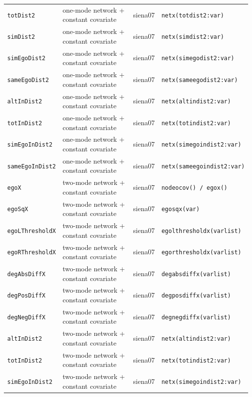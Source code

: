 \begin{longtable}{@{}p{2.6cm}p{3.2cm}p{2.9cm}p{5.4cm}@{}}
\texttt{totDist2} & one-mode network + constant covariate & siena07 & \texttt{netx(totdist2:var)}\\
\texttt{simDist2} & one-mode network + constant covariate & siena07 & \texttt{netx(simdist2:var)}\\
\texttt{simEgoDist2} & one-mode network + constant covariate & siena07 & \texttt{netx(simegodist2:var)}\\
\texttt{sameEgoDist2} & one-mode network + constant covariate & siena07 & \texttt{netx(sameegodist2:var)}\\
\texttt{altInDist2} & one-mode network + constant covariate & siena07 & \texttt{netx(altindist2:var)}\\
\texttt{totInDist2} & one-mode network + constant covariate & siena07 & \texttt{netx(totindist2:var)}\\
\texttt{simEgoInDist2} & one-mode network + constant covariate & siena07 & \texttt{netx(simegoindist2:var)}\\
\texttt{sameEgoInDist2} & one-mode network + constant covariate & siena07 & \texttt{netx(sameegoindist2:var)}\\
\texttt{egoX} & two-mode network + constant covariate & siena07 & \texttt{nodeocov() / egox()}\\
\texttt{egoSqX} & two-mode network + constant covariate & siena07 & \texttt{egosqx(var)}\\
\texttt{egoLThresholdX} & two-mode network + constant covariate & siena07 & \texttt{egolthresholdx(varlist)}\\
\texttt{egoRThresholdX} & two-mode network + constant covariate & siena07 & \texttt{egorthresholdx(varlist)}\\
\texttt{degAbsDiffX} & two-mode network + constant covariate & siena07 & \texttt{degabsdiffx(varlist)}\\
\texttt{degPosDiffX} & two-mode network + constant covariate & siena07 & \texttt{degposdiffx(varlist)}\\
\texttt{degNegDiffX} & two-mode network + constant covariate & siena07 & \texttt{degnegdiffx(varlist)}\\
\texttt{altInDist2} & two-mode network + constant covariate & siena07 & \texttt{netx(altindist2:var)}\\
\texttt{totInDist2} & two-mode network + constant covariate & siena07 & \texttt{netx(totindist2:var)}\\
\texttt{simEgoInDist2} & two-mode network + constant covariate & siena07 & \texttt{netx(simegoindist2:var)}\\

\end{longtable}
